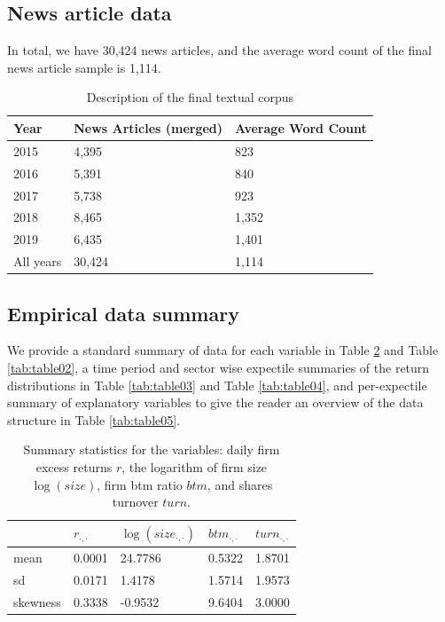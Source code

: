 \documentclass[]{article}
\begin{document}
\hypertarget{news-article-data}{%
\subsection*{News article data}\label{news-article-data}}

In total, we have 30,424 news articles, and the average word count of the final news article sample is 1,114.
\vspace{-0.5cm}
\begin{table}[hb!]

\caption{\label{tab:table00}Description of the final textual corpus}
\centering
\begin{tabular}[t]{l|l|l}
\hline
Year & News Articles (merged) & Average Word Count\\
\hline
2015 & 4,395 & 823\\
\hline
2016 & 5,391 & 840\\
\hline
2017 & 5,738 & 923\\
\hline
2018 & 8,465 & 1,352\\
\hline
2019 & 6,435 & 1,401\\
\hline
All years & 30,424 & 1,114\\
\hline
\end{tabular}
\end{table}


\hypertarget{empirical-data-summary}{%
\subsection*{Empirical data summary}\label{empirical-data-summary}}

We provide a standard summary of data for each variable in Table \ref{tab:table01} and Table \ref{tab:table02}, a time period and sector wise expectile summaries of the return distributions in Table \ref{tab:table03} and Table \ref{tab:table04}, and per-expectile summary of explanatory variables to give the reader an overview of the data structure in Table \ref{tab:table05}.

\vspace{-0.5cm}
\begin{table}[h!]

\caption{\label{tab:table01}Summary statistics for the variables: daily firm excess returns $r$, the logarithm of firm size $\log(size)$, firm btm ratio $btm$, and shares turnover $turn$.}
\centering
\begin{tabular}[t]{l|l|l|l|l}
\hline
  & $r_{\cdot,\cdot}$ & $\log(size_{\cdot,\cdot})$ & $btm_{\cdot,\cdot}$ & $turn_{\cdot,\cdot}$\\
\hline
  mean & 0.0001 & 24.7786 & 0.5322 & 1.8701 \\ 
\hline
  sd & 0.0171 & 1.4178 & 1.5714 & 1.9573 \\ 
\hline
  skewness & 0.3338 & -0.9532 & 9.6404 & 3.0000 \\ 
\hline
\end{tabular}
\end{table}
\end{document}
